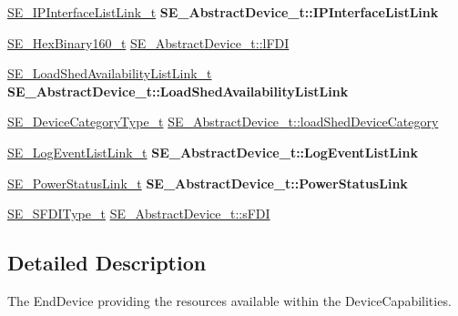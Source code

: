 \begin{DoxyCompactItemize}
\item 
\mbox{\label{group__AbstractDevice_ga874730749a33b012bf2a35e323e9eebe}} 
\hyperlink{structSE__IPInterfaceListLink__t}{S\+E\+\_\+\+I\+P\+Interface\+List\+Link\+\_\+t} {\bfseries S\+E\+\_\+\+Abstract\+Device\+\_\+t\+::\+I\+P\+Interface\+List\+Link}
\item 
\hyperlink{group__HexBinary160_ga92b92aa55555bdb75f3a59060f2c1632}{S\+E\+\_\+\+Hex\+Binary160\+\_\+t} \hyperlink{group__AbstractDevice_ga96f19b4ecd35a06cd9cdce0c1a78a340}{S\+E\+\_\+\+Abstract\+Device\+\_\+t\+::l\+F\+DI}
\item 
\mbox{\label{group__AbstractDevice_ga395c39d5a1ae0ba0789dba8c34e0b630}} 
\hyperlink{structSE__LoadShedAvailabilityListLink__t}{S\+E\+\_\+\+Load\+Shed\+Availability\+List\+Link\+\_\+t} {\bfseries S\+E\+\_\+\+Abstract\+Device\+\_\+t\+::\+Load\+Shed\+Availability\+List\+Link}
\item 
\hyperlink{group__DeviceCategoryType_gafc136ae19a3dd5b2fd2265d848ddeb2f}{S\+E\+\_\+\+Device\+Category\+Type\+\_\+t} \hyperlink{group__AbstractDevice_ga865ceb516365a2ee32b0c7bfe114dbc0}{S\+E\+\_\+\+Abstract\+Device\+\_\+t\+::load\+Shed\+Device\+Category}
\item 
\mbox{\label{group__AbstractDevice_gab9b730a9be336295b044820af83a5d1d}} 
\hyperlink{structSE__LogEventListLink__t}{S\+E\+\_\+\+Log\+Event\+List\+Link\+\_\+t} {\bfseries S\+E\+\_\+\+Abstract\+Device\+\_\+t\+::\+Log\+Event\+List\+Link}
\item 
\mbox{\label{group__AbstractDevice_gaf5fd797d09ec3c8ae7c745877381ba44}} 
\hyperlink{structSE__PowerStatusLink__t}{S\+E\+\_\+\+Power\+Status\+Link\+\_\+t} {\bfseries S\+E\+\_\+\+Abstract\+Device\+\_\+t\+::\+Power\+Status\+Link}
\item 
\hyperlink{group__SFDIType_ga08ad209b3cfce51cbdc450d1d35a1045}{S\+E\+\_\+\+S\+F\+D\+I\+Type\+\_\+t} \hyperlink{group__AbstractDevice_ga696fa49a4a1e6f84ad0ebe683906fa77}{S\+E\+\_\+\+Abstract\+Device\+\_\+t\+::s\+F\+DI}
\end{DoxyCompactItemize}


\subsection{Detailed Description}
The End\+Device providing the resources available within the Device\+Capabilities. 

